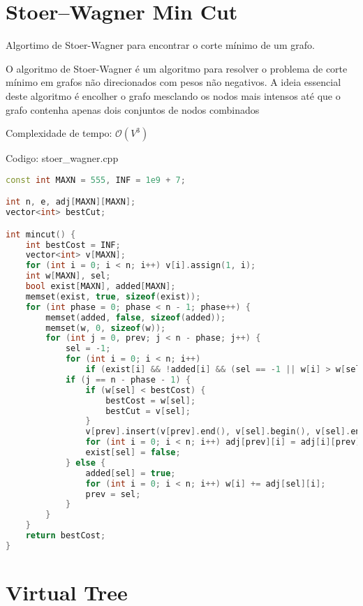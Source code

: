 \documentclass[10pt, a4paper, oneside]{book}
\begin{document}
\section{Stoer–Wagner Min Cut}


Algortimo de Stoer-Wagner para encontrar o corte mínimo de um grafo.



O algoritmo de Stoer-Wagner é um algoritmo para resolver o problema de corte mínimo em grafos não direcionados com pesos não negativos. A ideia essencial deste algoritmo é encolher o grafo mesclando os nodos mais intensos até que o grafo contenha apenas dois conjuntos de nodos combinados



Complexidade de tempo: $\mathcal{O}(V^3)$

\hfill

Codigo: stoer\_wagner.cpp

\begin{lstlisting}[language=C++]
const int MAXN = 555, INF = 1e9 + 7;

int n, e, adj[MAXN][MAXN];
vector<int> bestCut;

int mincut() {
    int bestCost = INF;
    vector<int> v[MAXN];
    for (int i = 0; i < n; i++) v[i].assign(1, i);
    int w[MAXN], sel;
    bool exist[MAXN], added[MAXN];
    memset(exist, true, sizeof(exist));
    for (int phase = 0; phase < n - 1; phase++) {
        memset(added, false, sizeof(added));
        memset(w, 0, sizeof(w));
        for (int j = 0, prev; j < n - phase; j++) {
            sel = -1;
            for (int i = 0; i < n; i++)
                if (exist[i] && !added[i] && (sel == -1 || w[i] > w[sel])) sel = i;
            if (j == n - phase - 1) {
                if (w[sel] < bestCost) {
                    bestCost = w[sel];
                    bestCut = v[sel];
                }
                v[prev].insert(v[prev].end(), v[sel].begin(), v[sel].end());
                for (int i = 0; i < n; i++) adj[prev][i] = adj[i][prev] += adj[sel][i];
                exist[sel] = false;
            } else {
                added[sel] = true;
                for (int i = 0; i < n; i++) w[i] += adj[sel][i];
                prev = sel;
            }
        }
    }
    return bestCost;
}\end{lstlisting}
\hfill

\section{Virtual Tree}
\end{document}
